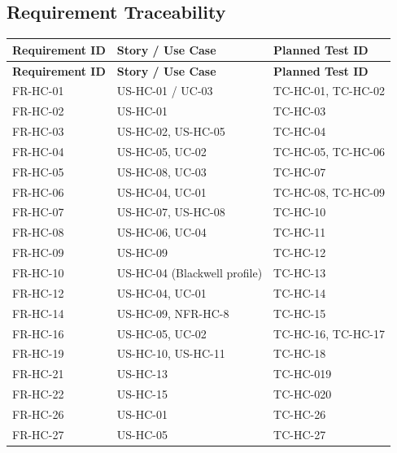 \documentclass[12pt,a4paper]{article}
\begin{document}
\subsection{Requirement Traceability}

\begin{longtable}{@{}L{3cm}L{4cm}L{4cm}@{}}
  
    \textbf{Requirement ID} & \textbf{Story / Use Case} & \textbf{Planned Test ID} \\
  \midrule
  \endfirsthead
  
    \textbf{Requirement ID} & \textbf{Story / Use Case} & \textbf{Planned Test ID} \\
  \midrule
  \endhead
  
  \endfoot

  FR-HC-01 & US-HC-01 / UC-03 & TC-HC-01, TC-HC-02 \\
    FR-HC-02 & US-HC-01 & TC-HC-03 \\
  FR-HC-03 & US-HC-02, US-HC-05 & TC-HC-04 \\
    FR-HC-04 & US-HC-05, UC-02 & TC-HC-05, TC-HC-06 \\
  FR-HC-05 & US-HC-08, UC-03 & TC-HC-07 \\
    FR-HC-06 & US-HC-04, UC-01 & TC-HC-08, TC-HC-09 \\
  FR-HC-07 & US-HC-07, US-HC-08 & TC-HC-10 \\
    FR-HC-08 & US-HC-06, UC-04 & TC-HC-11 \\
  FR-HC-09 & US-HC-09 & TC-HC-12 \\
    FR-HC-10 & US-HC-04 (Blackwell profile) & TC-HC-13 \\
  FR-HC-12 & US-HC-04, UC-01 & TC-HC-14 \\
    FR-HC-14 & US-HC-09, NFR-HC-8 & TC-HC-15 \\
  FR-HC-16 & US-HC-05, UC-02 & TC-HC-16, TC-HC-17 \\
    FR-HC-19 & US-HC-10, US-HC-11 & TC-HC-18 \\
  FR-HC-21 & US-HC-13 & TC-HC-019 \\
    FR-HC-22 & US-HC-15 & TC-HC-020 \\
  FR-HC-26 & US-HC-01 & TC-HC-26 \\
    FR-HC-27 & US-HC-05 & TC-HC-27 \\
\end{longtable}
\end{document}
